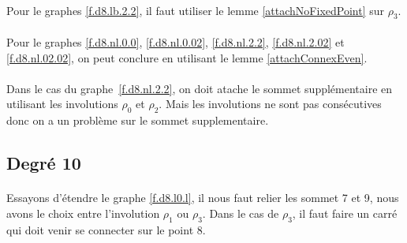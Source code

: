 \documentclass[a4paper]{article}
\theoremstyle{mytheorem}
\begin{document}
\paragraph{}
Pour le graphes \ref{f.d8.lb.2.2}, il faut utiliser le lemme \ref{attachNoFixedPoint} sur $\rho_3$.

\paragraph{}
Pour le graphes \ref{f.d8.nl.0.0}, \ref{f.d8.nl.0.02}, \ref{f.d8.nl.2.2}, \ref{f.d8.nl.2.02} et \ref{f.d8.nl.02.02}, on peut conclure en utilisant le lemme \ref{attachConnexEven}.

\paragraph{}
Dans le cas du graphe~\ref{f.d8.nl.2.2}, on doit atache le sommet supplémentaire en utilisant les involutions $\rho_0$ et $\rho_2$. Mais les involutions ne sont pas consécutives donc on a un problème sur le sommet supplementaire.

\subsection{Degré 10}

\paragraph{}
Essayons d'étendre le graphe \ref{f.d8.l0.l}, il nous faut relier les sommet 7 et 9, nous avons le choix entre l'involution $\rho_1$ ou $\rho_3$. Dans le cas de $\rho_3$, il faut faire un carré qui doit venir se connecter sur le point 8.
\end{document}
